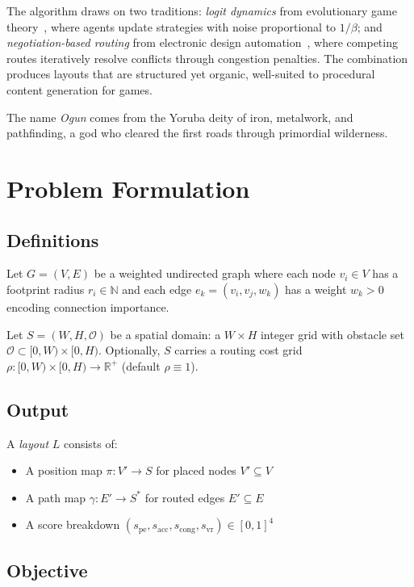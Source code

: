 \documentclass[11pt,a4paper]{article}
\begin{document}
The algorithm draws on two traditions: \emph{logit dynamics} from evolutionary
game theory~\cite{blume1993}, where agents update strategies with noise
proportional to $1/\beta$; and \emph{negotiation-based routing} from electronic
design automation~\cite{mcmurchie1995}, where competing routes iteratively
resolve conflicts through congestion penalties. The combination produces layouts
that are structured yet organic, well-suited to procedural content generation
for games.

The name \emph{Ogun} comes from the Yoruba deity of iron, metalwork, and
pathfinding, a god who cleared the first roads through primordial wilderness.

\section{Problem Formulation}

\subsection{Definitions}

Let $G = (V, E)$ be a weighted undirected graph where each node $v_i \in V$ has
a footprint radius $r_i \in \mathbb{N}$ and each edge $e_k = (v_i, v_j, w_k)$
has a weight $w_k > 0$ encoding connection importance.

Let $S = (W, H, \mathcal{O})$ be a spatial domain: a $W \times H$ integer grid
with obstacle set $\mathcal{O} \subset [0,W) \times [0,H)$. Optionally, $S$
carries a routing cost grid $\rho: [0,W) \times [0,H) \to \mathbb{R}^+$
(default $\rho \equiv 1$).

\subsection{Output}

A \emph{layout} $L$ consists of:
\begin{itemize}
    \item A position map $\pi: V' \to S$ for placed nodes $V' \subseteq V$
    \item A path map $\gamma: E' \to S^*$ for routed edges $E' \subseteq E$
    \item A score breakdown $(s_\text{pe}, s_\text{acc}, s_\text{cong}, s_\text{vr}) \in [0,1]^4$
\end{itemize}

\subsection{Objective}
\end{document}
